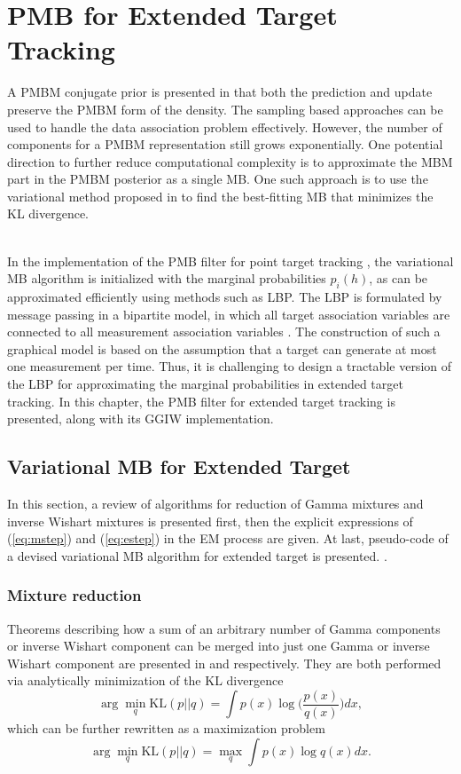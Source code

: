 \chapter{PMB for Extended Target Tracking}
A PMBM conjugate prior is presented in \cite{pmbmextended,pmbmextended2} that both the prediction and update preserve the PMBM form of the density. The sampling based approaches can be used to handle the data association problem effectively. However, the number of components for a PMBM representation still grows exponentially. One potential direction to further reduce computational complexity is to approximate the MBM part in the PMBM posterior as a single MB. One such approach is to use the variational method proposed in \cite{variational} to find the best-fitting MB that minimizes the KL divergence. 

~\\
In the implementation of the PMB filter for point target tracking \cite{variational}, the variational MB algorithm is initialized with the marginal probabilities $p_i(h)$, as can be approximated efficiently using methods such as LBP. The LBP is formulated by message passing in a bipartite model, in which all target association variables are connected to all measurement association variables \cite{lbp}. The construction of such a graphical model is based on the assumption that a target can generate at most one measurement per time. Thus, it is challenging to design a tractable version of the LBP for approximating the marginal probabilities in extended target tracking. In this chapter, the PMB filter for extended target tracking is presented, along with its GGIW implementation.  

\section{Variational MB for Extended Target}
In this section, a review of algorithms for reduction of Gamma mixtures and inverse Wishart mixtures \cite{phdextended,gammareduction} is presented first, then the explicit expressions of (\ref{eq:mstep}) and (\ref{eq:estep}) in the EM process are given. At last, pseudo-code of a devised variational MB algorithm for extended target is presented. \cite{simplex}. 

\subsection{Mixture reduction}
Theorems describing how a sum of an arbitrary number of Gamma components or inverse Wishart component can be merged into just one Gamma or inverse Wishart component are presented in \cite{gammareduction} and \cite{phdextended} respectively. They are both performed via analytically minimization of the KL divergence
\begin{equation}
    \arg\min\limits_q\text{KL}(p||q) = \int p(x)\log\bigg(\frac{p(x)}{q(x)}\bigg)dx,
\end{equation}
which can be further rewritten as a maximization problem
\begin{equation}
    \arg\min\limits_q\text{KL}(p||q) = \max\limits_q\int p(x)\log q(x)dx.
\end{equation}
